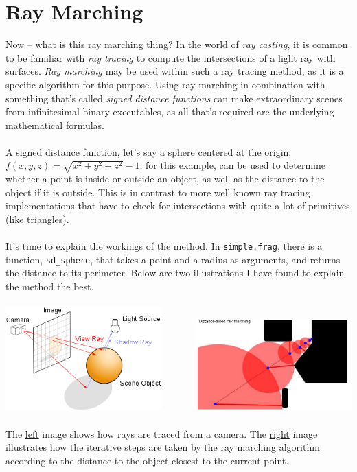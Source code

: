 \documentclass[abstract=off,oneside]{scrreprt}
\begin{document}
\section*{Ray Marching}
\label{sec-3}
Now -- what is this ray marching thing? In the world of \emph{ray casting},
it is common to be familiar with \emph{ray tracing} to compute the
intersections of a light ray with surfaces. \emph{Ray marching} may be used
within such a ray tracing method, as it is a specific algorithm for
this purpose. Using ray marching in combination with something that's
called \emph{signed distance functions} can make extraordinary scenes from
infinitesimal binary executables, as all that's required are the
underlying mathematical formulas.
\\\\
A signed distance function, let's say a sphere centered at the origin,
$f(x, y, z) = \sqrt{x^2 + y^2 + z^2} - 1$, for this example, can be
used to determine whether a point is inside or outside an object, as
well as the distance to the object if it is outside. This is in
contrast to more well known ray tracing implementations that have to
check for intersections with quite a lot of primitives (like
triangles).
\\\\
It's time to explain the workings of the method. In \verb~simple.frag~,
there is a function, \verb~sd_sphere~, that takes a point and a radius as
arguments, and returns the distance to its perimeter. Below are two
illustrations I have found to explain the method the best.
\\\\
\includegraphics[width=0.45\textwidth]{./img/raytrace.png}
$\hspace{35pt}$
\includegraphics[width=0.45\textwidth]{./img/sphere_tracing.jpg}
\\\\
The \href{http://jamie-wong.com/images/16-07-11/raytrace.png}{left} image shows how rays are traced from a camera. The \href{http://hugi.scene.org/online/hugi37/sphere_tracing.jpg}{right}
image illustrates how the iterative steps are taken by the ray
marching algorithm according to the distance to the object closest to
the current point.
\end{document}
